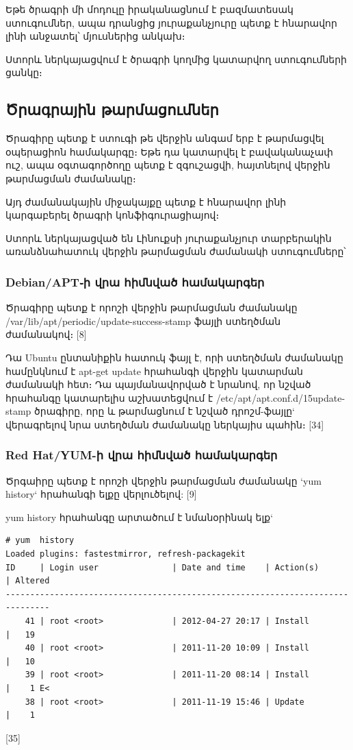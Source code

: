 \documentclass[12pt]{article}
\begin{document}
\begin{sloppypar}
Եթե ծրագրի մի մոդուլը իրականացնում է բազմատեսակ ստուգումներ,
ապա դրանցից յուրաքանչյուրը պետք է հնարավոր լինի անջատել՝
մյուսներից անկախ։

Ստորև ներկայացվում է ծրագրի կողմից կատարվող ստուգումների ցանկը։


\subsection{Ծրագրային թարմացումներ}

Ծրագիրը պետք է ստուգի թե վերջին անգամ երբ է թարմացվել
օպերացիոն համակարգը։
Եթե դա կատարվել է բավականաչափ ուշ, ապա օգտագործողը պետք է
զգուշացվի, հայտնելով վերջին թարմացման ժամանակը։

Այդ ժամանակային միջակայքը պետք է հնարավոր լինի կարգաբերել ծրագրի կոնֆիգուրացիայով։

Ստորև ներկայացված են Լինուքսի յուրաքանչյուր տարբերակին առանձնահատուկ
վերջին թարմացման ժամանակի ստուգումները՝

\subsubsection{Debian/APT֊ի վրա հիմնված համակարգեր}

Ծրագիրը պետք է որոշի վերջին թարմացման ժամանակը
/var/lib/apt/periodic/update-success-stamp
ֆայլի ստեղծման ժամանակով։ [8]

Դա Ubuntu ընտանիքին հատուկ ֆայլ է, որի ստեղծման ժամանակը համընկնում է
apt-get update հրահանգի վերջին կատարման ժամանակի հետ։ Դա պայմանավորված է
նրանով, որ նշված հրահանգը կատարելիս աշխատեցվում է
/etc/apt/apt.conf.d/15update-stamp
ծրագիրը, որը և թարմացնում է նշված դրոշմ-ֆայլը` վերագրելով նրա
ստեղծման ժամանակը ներկայիս պահին։
[34]

\subsubsection{Red Hat/YUM-ի վրա հիմնված համակարգեր}

Ծրգաիրը պետք է որոշի վերջին թարմացման ժամանակը `yum history`
հրահանգի ելքը վերլուծելով: [9]

yum history հրահանգը արտածում է նմանօրինակ ելք`

\begin{lstlisting}[language={}]
# yum  history
Loaded plugins: fastestmirror, refresh-packagekit
ID     | Login user               | Date and time    | Action(s)      | Altered
-------------------------------------------------------------------------------
    41 | root <root>              | 2012-04-27 20:17 | Install        |   19   
    40 | root <root>              | 2011-11-20 10:09 | Install        |   10   
    39 | root <root>              | 2011-11-20 08:14 | Install        |    1 E<
    38 | root <root>              | 2011-11-19 15:46 | Update         |    1 
\end{lstlisting}
[35]


\end{sloppypar}
\end{document}
